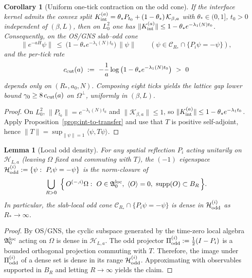 \documentclass[11pt]{amsart}
\theoremstyle{plain}
\newtheorem{lemma}[theorem]{Lemma}
\newtheorem{corollary}[theorem]{Corollary}
\theoremstyle{definition}
\theoremstyle{remark}
\begin{document}
\begin{corollary}[Uniform one-tick contraction on the odd cone]\label{cor:odd-contraction-from-Kint}
If the interface kernel admits the convex split $K_{\rm int}^{(a)}=\theta_* P_{t_0}+(1-\theta_*)\,\mathcal K_{\beta,a}$ with $\theta_*\in(0,1]$, $t_0>0$ independent of $(\beta,L)$, then on $L^2_0$ one has $\|K_{\rm int}^{(a)}\|\le 1-\theta_* e^{-\lambda_1(N) t_0}$. Consequently, on the OS/GNS slab--odd cone
\[
  \|e^{-aH}\psi\|\ \le\ \big(1-\theta_* e^{-\lambda_1(N) t_0}\big)\,\|\psi\|\qquad(\psi\in\mathcal C_{R_*}\cap\{P_i\psi=-\psi\}),
\]
and the per-tick rate
\[
  c_{\rm cut}(a)\ :=\ -\frac{1}{a}\log\big(1-\theta_* e^{-\lambda_1(N) t_0}\big)\ >\ 0
\]
depends only on $(R_*,a_0,N)$. Composing eight ticks yields the lattice gap lower bound $\gamma_0\ge 8\,c_{\rm cut}(a)$ on $\Omega^{\perp}$, uniformly in $(\beta,L)$.
\end{corollary}
\begin{proof}
On $L^2_0$, $\|P_{t_0}\|=e^{-\lambda_1(N) t_0}$ and $\|\mathcal K_{\beta,a}\|\le 1$, so $\|K_{\rm int}^{(a)}\|\le 1-\theta_* e^{-\lambda_1 t_0}$. Apply Proposition~\ref{prop:int-to-transfer} and use that $T$ is positive self-adjoint, hence $\|T\|=\sup_{\|\psi\|=1}\langle\psi,T\psi\rangle$.
\end{proof}

\begin{lemma}[Local odd density]\label{lem:odd-density}
For any spatial reflection $P_i$ acting unitarily on $\mathcal H_{L,a}$ (leaving $\Omega$ fixed and commuting with $T$), the $(-1)$ eigenspace $\mathcal H_{\rm odd}^{(i)}:=\{\psi:\ P_i\psi=-\psi\}$ is the norm-closure of
\[
  \bigcup_{R>0}\ \Big\{\,O^{(-,i)}\Omega:\ O\in \mathfrak A_0^{\rm loc},\ \langle O\rangle=0,\ \mathrm{supp}(O)\subset B_R\,\Big\}.
\]
In particular, the slab-local odd cone $\mathcal C_{R_*}\cap\{P_i\psi=-\psi\}$ is dense in $\mathcal H_{\rm odd}^{(i)}$ as $R_*\to\infty$.
\end{lemma}
\begin{proof}
By OS/GNS, the cyclic subspace generated by the time-zero local algebra $\mathfrak A_0^{\rm loc}$ acting on $\Omega$ is dense in $\mathcal H_{L,a}$. The odd projector $\Pi_{\rm odd}^{(i)}:=\tfrac12(I-P_i)$ is a bounded orthogonal projection commuting with $T$. Therefore, the image under $\Pi_{\rm odd}^{(i)}$ of a dense set is dense in its range $\mathcal H_{\rm odd}^{(i)}$. Approximating with observables supported in $B_R$ and letting $R\to\infty$ yields the claim.
\end{proof}
\end{document}
